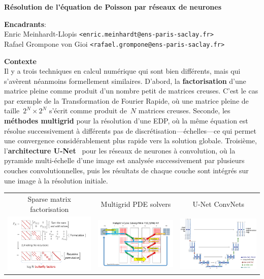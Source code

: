 \documentclass[a4paper,11pt]{article}
\begin{document}
\thispagestyle{empty}

{\bf
	Résolution de l'équation de Poisson par réseaux de neurones
}

{\bf Encadrants}:\\
Enric Meinhardt-Llopis \verb+<enric.meinhardt@ens-paris-saclay.fr>+\\
Rafael Grompone von Gioi \verb+<rafael.grompone@ens-paris-saclay.fr>+

{\bf Contexte}\\
Il y a trois techniques en calcul numérique qui sont bien différents, mais qui
s'avèrent néanmoins formellement similaires.  D'abord, la {\bf factorisation}
d'une matrice pleine comme produit d'un nombre petit de matrices creuses.
C'est le cas par exemple de la Transformation de Fourier Rapide, où une matrice
pleine de taille~$2^N\times2^N$ s'écrit comme produit de~$N$ matrices creuses.
Seconde, les {\bf méthodes multigrid} pour la résolution d'une EDP, où la même
équation est résolue successivement à différents pas de
discrétisation---échelles---ce qui permet une convergence considérablement plus
rapide vers la solution globale.  Troisième, l'{\bf architecture
U-Net}~\cite{unet} pour les réseaux de neurones à convolution, où la pyramide
multi-échelle d'une image est analysée successivement par plusieurs couches
convolutionnelles, puis les résultats de chaque couche sont intégrés sur une
image à la résolution initiale.

\begin{tabular}{ccc}
	\sf\color{blue} Sparse matrix factorisation &
	\sf\color{blue} Multigrid PDE solvers&
	\sf\color{blue} U-Net ConvNets\\
	\includegraphics[width=0.32\linewidth]{f/butterflies.png} &
	\includegraphics[width=0.3\linewidth]{f/multigrid.png} &
	\includegraphics[width=0.32\linewidth]{f/cunet.png} \\
\end{tabular}
\end{document}
